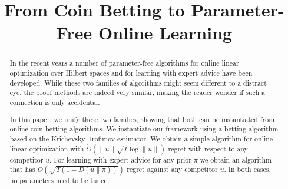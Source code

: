 \documentclass{colt2016} %
\title{From Coin Betting to Parameter-Free Online Learning}
\newcommand{\KL}[2]{D({#1}\|{#2})}  %
\begin{document}
\maketitle

\begin{abstract}
In the recent years a number of parameter-free algorithms for online linear
optimization over Hilbert spaces and for learning with expert advice have been
developed. While these two families of algorithms might seem different to a
distract eye, the proof methods are indeed very similar, making the reader
wonder if such a connection is only accidental.

In this paper, we unify these two families, showing that both can be
instantiated from online coin betting algorithms. We instantiate our framework
using a betting algorithm based on the Krichevsky-Trofimov estimator. We obtain
a simple algorithm for online linear optimization with $\widetilde
O(\|u\|\sqrt{T \log\|u\|})$ regret with respect to any competitor $u$. For
learning with expert advice for any prior $\pi$ we obtain an algorithm that has
$O(\sqrt{T (1 + \KL{u}{\pi})})$ regret against any competitor $u$. In both
cases, no parameters need to be tuned.
\end{abstract}











\appendix

\end{document}
